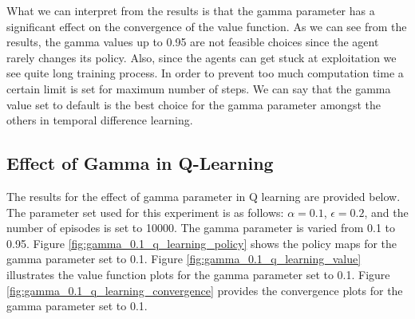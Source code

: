 \documentclass{assignment}
\begin{document}
What we can interpret from the results is that the gamma parameter has a significant effect on the convergence of the value function. As we can see from the results, the gamma values up to 0.95 are not feasible choices since the agent rarely changes its policy. Also, since the agents can get stuck at exploitation we see quite long training process. In order to prevent too much computation time a certain limit is set for maximum number of steps. We can say that the gamma value set to default is the best choice for the gamma parameter amongst the others in temporal difference learning.  

\subsection{Effect of Gamma in Q-Learning}
The results for the effect of gamma parameter in Q learning are provided below. The parameter set used for this experiment is as follows: $\alpha = 0.1$, $\epsilon = 0.2$, and the number of episodes is set to 10000. The gamma parameter is varied from 0.1 to 0.95.
Figure \ref{fig:gamma_0.1_q_learning_policy} shows the policy maps for the gamma parameter set to 0.1. Figure \ref{fig:gamma_0.1_q_learning_value} illustrates the value function plots for the gamma parameter set to 0.1. Figure \ref{fig:gamma_0.1_q_learning_convergence} provides the convergence plots for the gamma parameter set to 0.1.
\end{document}
